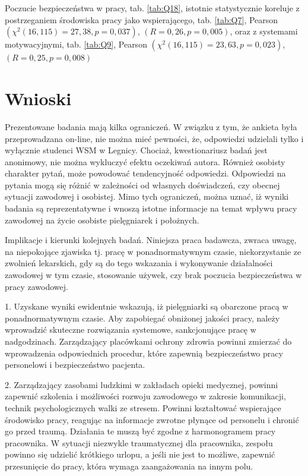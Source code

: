 \documentclass[a4paper,12pt,twoside,openright]{mwrep}
\begin{document}

%

Poczucie bezpieczeństwa w pracy, tab. \ref{tab:Q18}, istotnie statystycznie koreluje z postrzeganiem środowiska pracy jako wspierającego, tab. \ref{tab:Q7}, Pearson $(\chi^2 (16, 115) = 27,38, p = 0,037)$, $(R = 0,26, p = 0,005)$, oraz z systemami motywacyjnymi, tab. \ref{tab:Q9}, Pearson $(\chi^2 (16, 115) = 23,63, p = 0,023)$, $(R = 0,25, p = 0,008)$
	



\vspace{\baselineskip} 


\chapter*{Wnioski}
Prezentowane badania mają kilka ograniczeń. W związku z tym, że ankieta była przeprowadzana on-line, nie można mieć pewności, że, odpowiedzi udzielali tylko i wyłącznie studenci WSM w Legnicy.  Chociaż, kwestionariusz badań jest anonimowy, nie można wykluczyć efektu oczekiwań autora. Również osobisty charakter pytań, może powodować tendencyjność odpowiedzi. Odpowiedzi na pytania mogą się różnić w zależności od własnych doświadczeń,  czy obecnej sytuacji zawodowej i osobistej. Mimo tych ograniczeń, można uznać, iż wyniki badania są reprezentatywne i wnoszą istotne informacje na temat wpływu pracy zawodowej na życie osobiste pielęgniarek i położnych.

Implikacje i kierunki kolejnych badań.
Niniejsza praca badawcza, zwraca uwagę, na niepokojące zjawiska tj. pracę w ponadnormatywnym czasie, niekorzystanie ze zwolnień lekarskich, gdy są do tego wskazania i wykonywanie działalności zawodowej w tym czasie, stosowanie używek, czy brak poczucia bezpieczeństwa w pracy zawodowej.

1.	 Uzyskane wyniki ewidentnie wskazują, iż pielęgniarki są obarczone pracą w ponadnormatywnym czasie. Aby zapobiegać obniżonej jakości pracy, należy wprowadzić skuteczne rozwiązania systemowe, sankcjonujące pracę w nadgodzinach. Zarządzający placówkami ochrony zdrowia powinni zmierzać do wprowadzenia odpowiednich procedur, które zapewnią bezpieczeństwo pracy personelowi i bezpieczeństwo pacjenta.

2.	Zarządzający zasobami ludzkimi w zakładach opieki medycznej, powinni zapewnić szkolenia i możliwości rozwoju zawodowego w zakresie komunikacji, technik psychologicznych walki ze stresem. Powinni kształtować wspierające środowisko pracy, reagując na informacje zwrotne płynące od personelu i chronić go przed traumą. Działania te muszą być zgodne z harmonogramem pracy pracownika. W sytuacji niezwykle traumatycznej dla pracownika, zespołu powinno się udzielić krótkiego urlopu, a jeśli nie jest to możliwe, zapewnić przesunięcie do pracy, która wymaga zaangażowania na innym polu.
\end{document}
